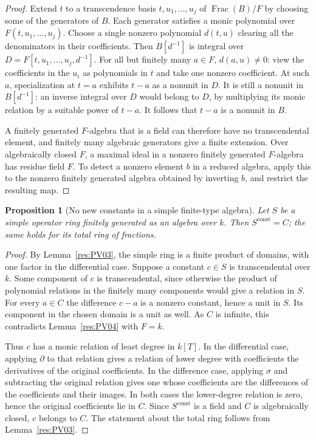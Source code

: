 \documentclass[11pt,oneside,openany]{book}
\newtheorem{proposition}[theorem]{Proposition}
\theoremstyle{definition}
\theoremstyle{remark}
\begin{document}
\begin{proof}
Extend \(t\) to a transcendence basis \(t,u_1,\dots,u_j\) of
\(\operatorname{Frac}(B)/F\) by choosing some of the generators of
\(B\). Each generator satisfies a monic polynomial over
\(F(t,u_1,\dots,u_j)\). Choose a single nonzero polynomial \(d(t,u)\)
clearing all the denominators in their coefficients. Then
\(B[d^{-1}]\) is integral over
\(D=F[t,u_1,\dots,u_j,d^{-1}]\).
For all but finitely many \(a\in F\), \(d(a,u)\ne0\):
view the coefficients in the \(u_i\) as polynomials in \(t\) and take
one nonzero coefficient. At such \(a\), specialization at \(t=a\)
exhibits \(t-a\) as a nonunit in \(D\). It is still a nonunit in
\(B[d^{-1}]\): an inverse integral over \(D\) would belong to \(D\),
by multiplying its monic relation by a suitable power of \(t-a\).
It follows that \(t-a\) is a nonunit in \(B\).

A finitely generated \(F\)-algebra that is a field can therefore
have no transcendental element, and finitely many algebraic
generators give a finite extension. Over algebraically closed \(F\),
a maximal ideal in a nonzero finitely generated \(F\)-algebra has
residue field \(F\). To detect a nonzero element \(b\) in a reduced
algebra, apply this to the nonzero finitely generated algebra
obtained by inverting \(b\), and restrict the resulting map.
\end{proof}

\begin{proposition}[No new constants in a simple finite-type algebra]
\label{res:PV05}
Let \(S\) be a simple operator ring finitely generated as an algebra
over \(k\). Then \(S^{\mathrm{const}}=C\); the same holds for
its total ring of fractions.
\end{proposition}

\begin{proof}
By Lemma~\ref{res:PV03}, the simple ring is a finite product of
domains, with one factor in the differential case. Suppose a
constant \(c\in S\) is transcendental over \(k\). Some component
of \(c\) is transcendental, since otherwise the product of
polynomial relations in the finitely many components would give a
relation in \(S\). For every \(a\in C\) the difference \(c-a\) is a
nonzero constant, hence a unit in \(S\). Its component in the
chosen domain is a unit as well. As \(C\) is infinite, this
contradicts Lemma~\ref{res:PV04} with \(F=k\).

Thus \(c\) has a monic relation of least degree in \(k[T]\).
In the differential case, applying \(\partial\) to that relation
gives a relation of lower degree with coefficients the derivatives of
the original coefficients. In the difference case, applying
\(\sigma\) and subtracting the original relation gives one whose
coefficients are the differences of the coefficients and their
images. In both cases the lower-degree relation is zero, hence the
original coefficients lie in \(C\). Since \(S^{\mathrm{const}}\)
is a field and \(C\) is algebraically closed, \(c\) belongs to
\(C\). The statement about the total ring follows from
Lemma~\ref{res:PV03}.
\end{proof}
\end{document}
